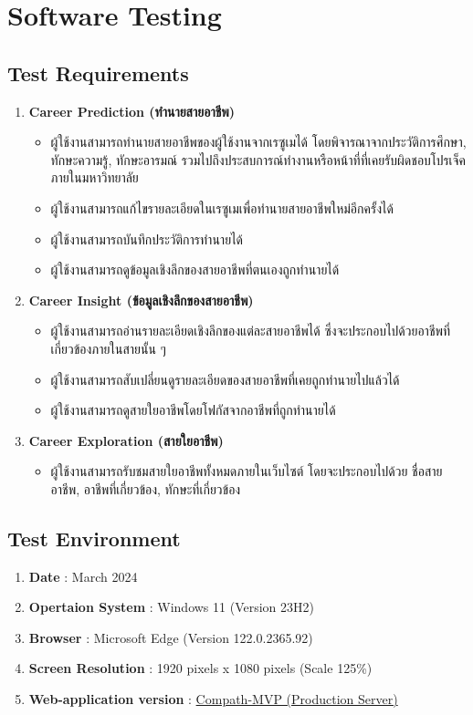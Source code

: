 \section{Software Testing}
\subsection{Test Requirements}
\begin{enumerate}
    \item \textbf{Career Prediction (ทำนายสายอาชีพ)}
          \begin{itemize}
              \item ผู้ใช้งานสามารถทำนายสายอาชีพของผู้ใช้งานจากเรซูเมได้ โดยพิจารณาจากประวัติการศึกษา, ทักษะความรู้, ทักษะอารมณ์ รวมไปถึงประสบการณ์ทำงานหรือหน้าที่ที่เคยรับผิดชอบโปรเจ็คภายในมหาวิทยาลัย
              \item ผู้ใช้งานสามารถแก้ไขรายละเอียดในเรซูเมเพื่อทำนายสายอาชีพใหม่อีกครั้งได้
              \item ผู้ใช้งานสามารถบันทึกประวัติการทำนายได้
              \item ผู้ใช้งานสามารถดูข้อมูลเชิงลึกของสายอาชีพที่ตนเองถูกทำนายได้
          \end{itemize}
    \item \textbf{Career Insight (ข้อมูลเชิงลึกของสายอาชีพ)}
          \begin{itemize}
              \item ผู้ใช้งานสามารถอ่านรายละเอียดเชิงลึกของแต่ละสายอาชีพได้ ซึ่งจะประกอบไปด้วยอาชีพที่เกี่ยวข้องภายในสายนั้น ๆ
              \item ผู้ใช้งานสามารถสับเปลี่ยนดูรายละเอียดของสายอาชีพที่เคยถูกทำนายไปแล้วได้
              \item ผู้ใช้งานสามารถดูสายใยอาชีพโดยโฟกัสจากอาชีพที่ถูกทำนายได้
          \end{itemize}
    \item \textbf{Career Exploration (สายใยอาชีพ)}
          \begin{itemize}
              \item ผู้ใช้งานสามารถรับชมสายใยอาชีพทั้งหมดภายในเว็บไซต์ โดยจะประกอบไปด้วย ชื่อสายอาชีพ, อาชีพที่เกี่ยวข้อง, ทักษะที่เกี่ยวข้อง
          \end{itemize}
\end{enumerate}
\label{sec:test-subsection}
\subsection{Test Environment}
\begin{enumerate}
    \item \textbf{Date} : March 2024
    \item \textbf{Opertaion System} : Windows 11 (Version 23H2)
    \item \textbf{Browser} : Microsoft Edge (Version 122.0.2365.92)
    \item \textbf{Screen Resolution} : 1920 pixels x 1080 pixels (Scale 125\%)
    \item \textbf{Web-application version} : \href{https://compath-qc72cy7wuq-as.a.run.app/}{Compath-MVP (Production Server)}
\end{enumerate}
